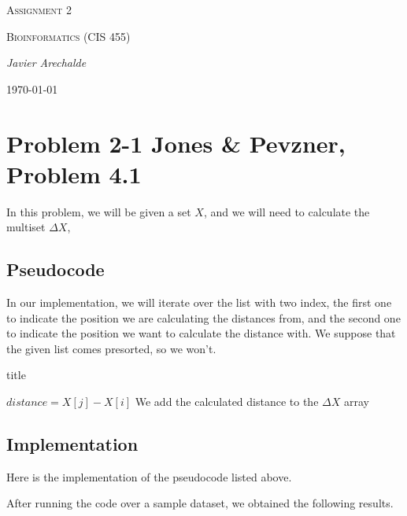 \documentclass{article}
\begin{document}
\begin{titlepage}
	\centering
	{\scshape\LARGE Assignment 2\par}
	\vspace{1cm}
	{\scshape\Large Bioinformatics (CIS 455)\par}
	\vspace{1.5cm}
	{\Large\itshape Javier Arechalde\par}
	\vfill
	{\large \today\par}
\end{titlepage}

\section*{Problem 2-1 Jones \& Pevzner, Problem 4.1}

In this problem, we will be given a set $X$, and we will need to calculate the multiset $\Delta X$,

\subsection*{Pseudocode}

In our implementation, we will iterate over the list with two index, the first one to indicate the position we are calculating the distances from, and the second one to indicate the position we want to calculate the distance with. We suppose that the given list comes presorted, so we won't.

\begin{algorithm}[H]
\caption{title}
\begin{algorithmic}
  \State $distance = X[j]-X[i]$
  \State We add the calculated distance to the $\Delta X$ array
 \EndFor
\EndFor
\end{algorithmic}
\end{algorithm}

\subsection*{Implementation}

Here is the implementation of the pseudocode listed above.



After running the code over a sample dataset, we obtained the following results.


\end{document}
